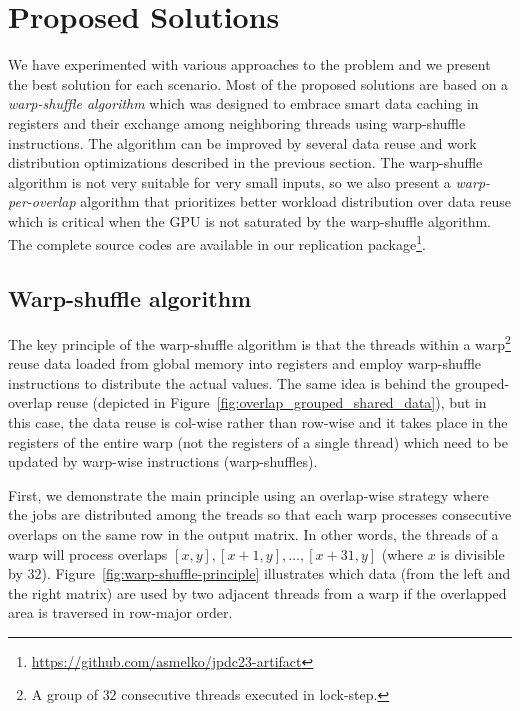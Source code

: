 \section{Proposed Solutions}\label{sec:algorithms}

We have experimented with various approaches to the problem and we present the best solution for each scenario. Most of the proposed solutions are based on a \emph{warp-shuffle algorithm} which was designed to embrace smart data caching in registers and their exchange among neighboring threads using warp-shuffle instructions. The algorithm can be improved by several data reuse and work distribution optimizations described in the previous section. The warp-shuffle algorithm is not very suitable for very small inputs, so we also present a \emph{warp-per-overlap} algorithm that prioritizes better workload distribution over data reuse which is critical when the GPU is not saturated by the warp-shuffle algorithm. The complete source codes are available in our replication package\footnote{\url{https://github.com/asmelko/jpdc23-artifact}}.

\subsection{Warp-shuffle algorithm}\label{sec:ws-algo}

The key principle of the warp-shuffle algorithm is that the threads within a warp\footnote{A group of $32$ consecutive threads executed in lock-step.} reuse data loaded from global memory into registers and employ warp-shuffle instructions to distribute the actual values. The same idea is behind the grouped-overlap reuse (depicted in Figure~\ref{fig:overlap_grouped_shared_data}), but in this case, the data reuse is col-wise rather than row-wise and it takes place in the registers of the entire warp (not the registers of a single thread) which need to be updated by warp-wise instructions (warp-shuffles).

First, we demonstrate the main principle using an overlap-wise strategy where the jobs are distributed among the treads so that each warp processes consecutive overlaps on the same row in the output matrix. In other words, the threads of a warp will process overlaps $[x,y], [x+1,y], \ldots, [x+31,y]$ (where $x$ is divisible by $32$). Figure~\ref{fig:warp-shuffle-principle} illustrates which data (from the left and the right matrix) are used by two adjacent threads from a warp if the overlapped area is traversed in row-major order.


